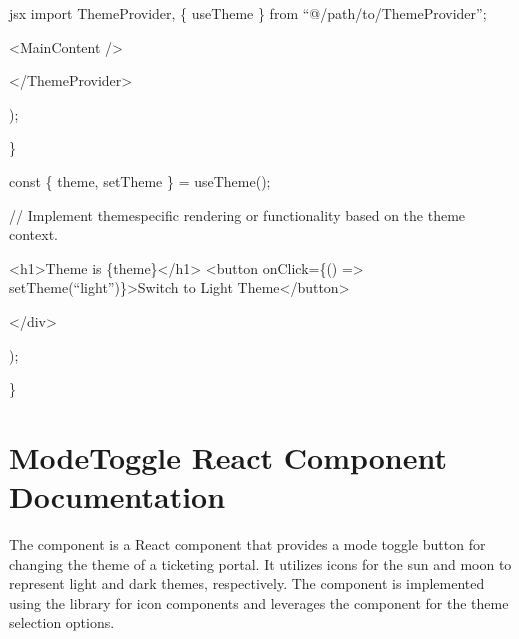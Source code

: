\documentclass[letterpaper,10pt,english]{sphinxmanual}
\begin{document}
\sphinxAtStartPar
{\color{red}\bfseries{}\textasciigrave{}\textasciigrave{}}{\color{red}\bfseries{}\textasciigrave{}}jsx
import ThemeProvider, \{ useTheme \} from “@/path/to/ThemeProvider”;
\begin{description}
\begin{description}
\begin{description}
\sphinxAtStartPar
\textless{}MainContent /\textgreater{}

\end{description}

\sphinxAtStartPar
\textless{}/ThemeProvider\textgreater{}

\end{description}

\sphinxAtStartPar
);

\end{description}

\sphinxAtStartPar
\}
\begin{description}
\sphinxAtStartPar
const \{ theme, setTheme \} = useTheme();

\sphinxAtStartPar
// Implement theme\sphinxhyphen{}specific rendering or functionality based on the theme context.
\begin{description}
\begin{description}
\sphinxAtStartPar
\textless{}h1\textgreater{}Theme is \{theme\}\textless{}/h1\textgreater{}
\textless{}button onClick=\{() =\textgreater{} setTheme(“light”)\}\textgreater{}Switch to Light Theme\textless{}/button\textgreater{}

\end{description}

\sphinxAtStartPar
\textless{}/div\textgreater{}

\end{description}

\sphinxAtStartPar
);

\end{description}

\sphinxAtStartPar
\}

\sphinxstepscope


\section{ModeToggle React Component Documentation}
\label{\detokenize{forms/toggle:modetoggle-react-component-documentation}}\label{\detokenize{forms/toggle::doc}}
\sphinxAtStartPar
The  component is a React component that provides a mode toggle button for changing the theme of a ticketing portal. It utilizes icons for the sun and moon to represent light and dark themes, respectively. The component is implemented using the  library for icon components and leverages the  component for the theme selection options.
\end{document}
